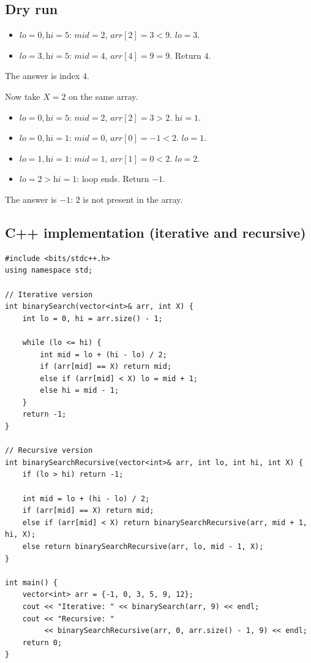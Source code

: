 \subsection*{Dry run}


\begin{itemize}
  \item $\textit{lo}=0,\textit{hi}=5$: $\textit{mid}=2$,
        $\textit{arr}[2]=3 < 9$. $\textit{lo}=3$.
  \item $\textit{lo}=3,\textit{hi}=5$: $\textit{mid}=4$,
        $\textit{arr}[4]=9 = 9$. Return $4$.
\end{itemize}

The answer is index $4$.

Now take $X = 2$ on the same array.

\begin{itemize}
  \item $\textit{lo}=0,\textit{hi}=5$: $\textit{mid}=2$,
        $\textit{arr}[2]=3 > 2$. $\textit{hi}=1$.
  \item $\textit{lo}=0,\textit{hi}=1$: $\textit{mid}=0$,
        $\textit{arr}[0]=-1 < 2$. $\textit{lo}=1$.
  \item $\textit{lo}=1,\textit{hi}=1$: $\textit{mid}=1$,
        $\textit{arr}[1]=0 < 2$. $\textit{lo}=2$.
  \item $\textit{lo}=2 > \textit{hi}=1$: loop ends. Return $-1$.
\end{itemize}

The answer is $-1$: $2$ is not present in the array.

\subsection*{C++ implementation (iterative and recursive)}

\begin{lstlisting}
#include <bits/stdc++.h>
using namespace std;

// Iterative version
int binarySearch(vector<int>& arr, int X) {
    int lo = 0, hi = arr.size() - 1;

    while (lo <= hi) {
        int mid = lo + (hi - lo) / 2;
        if (arr[mid] == X) return mid;
        else if (arr[mid] < X) lo = mid + 1;
        else hi = mid - 1;
    }
    return -1;
}

// Recursive version
int binarySearchRecursive(vector<int>& arr, int lo, int hi, int X) {
    if (lo > hi) return -1;

    int mid = lo + (hi - lo) / 2;
    if (arr[mid] == X) return mid;
    else if (arr[mid] < X) return binarySearchRecursive(arr, mid + 1, hi, X);
    else return binarySearchRecursive(arr, lo, mid - 1, X);
}

int main() {
    vector<int> arr = {-1, 0, 3, 5, 9, 12};
    cout << "Iterative: " << binarySearch(arr, 9) << endl;
    cout << "Recursive: "
         << binarySearchRecursive(arr, 0, arr.size() - 1, 9) << endl;
    return 0;
}
\end{lstlisting}

